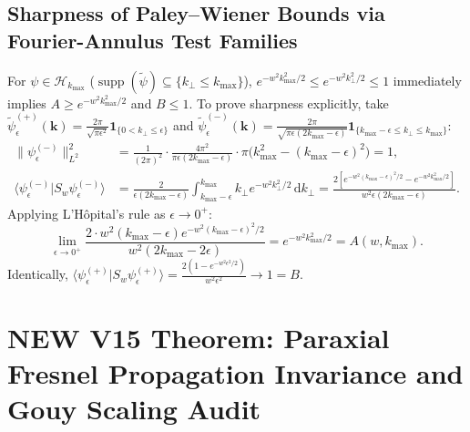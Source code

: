 \documentclass[10pt,letterpaper]{article}
\newcommand{\braket}[2]{\langle #1 | #2 \rangle}
\newcommand{\norm}[1]{\lVert #1 \rVert}
\newcommand{\dd}{\mathrm{d}}
\numberwithin{equation}{section}
\begin{document}
\subsection{Sharpness of Paley--Wiener Bounds via Fourier-Annulus Test Families}
For $\psi \in \mathcal{H}_{k_{\max}}$ ($\operatorname{supp}(\widetilde{\psi}) \subseteq \{k_\perp \le k_{\max}\}$), $e^{-w^2 k_{\max}^2/2} \le e^{-w^2 k_\perp^2/2} \le 1$ immediately implies $A \ge e^{-w^2 k_{\max}^2/2}$ and $B \le 1$. To prove sharpness explicitly, take $\widetilde{\psi}_\epsilon^{(+)}(\mathbf{k}) = \frac{2\pi}{\sqrt{\pi\epsilon^2}}\mathbf{1}_{\{0 < k_\perp \le \epsilon\}}$ and $\widetilde{\psi}_\epsilon^{(-)}(\mathbf{k}) = \frac{2\pi}{\sqrt{\pi\epsilon(2k_{\max}-\epsilon)}}\mathbf{1}_{\{k_{\max}-\epsilon \le k_\perp \le k_{\max}\}}$:
\begin{align}
  \norm{\psi_\epsilon^{(-)}}_{L^2}^2 &= \frac{1}{(2\pi)^2} \cdot \frac{4\pi^2}{\pi\epsilon(2k_{\max}-\epsilon)} \cdot \pi\bigl(k_{\max}^2 - (k_{\max}-\epsilon)^2\bigr) = 1, \\
  \braket{\psi_\epsilon^{(-)}}{S_w\psi_\epsilon^{(-)}} &= \frac{2}{\epsilon(2k_{\max}-\epsilon)}\int_{k_{\max}-\epsilon}^{k_{\max}} k_\perp e^{-w^2 k_\perp^2/2}\,\dd k_\perp = \frac{2\left[e^{-w^2(k_{\max}-\epsilon)^2/2} - e^{-w^2 k_{\max}^2/2}\right]}{w^2\epsilon(2k_{\max}-\epsilon)}.
\end{align}
Applying L'H\^opital's rule as $\epsilon \to 0^+$:
\begin{equation}
  \lim_{\epsilon\to 0^+} \frac{2\cdot w^2(k_{\max}-\epsilon) e^{-w^2(k_{\max}-\epsilon)^2/2}}{w^2(2k_{\max} - 2\epsilon)} = e^{-w^2 k_{\max}^2/2} = A(w,k_{\max}).
\end{equation}
Identically, $\braket{\psi_\epsilon^{(+)}}{S_w\psi_\epsilon^{(+)}} = \frac{2(1 - e^{-w^2\epsilon^2/2})}{w^2\epsilon^2} \to 1 = B$.

\section{NEW V15 Theorem: Paraxial Fresnel Propagation Invariance and Gouy Scaling Audit}
\label{sec:p1_fresnel}
\end{document}
